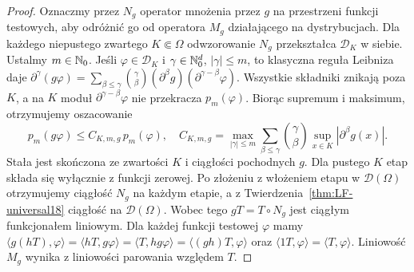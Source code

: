 \begin{proof}
Oznaczmy przez $N_g$ operator mnożenia przez $g$ na
przestrzeni funkcji testowych, aby odróżnić go od operatora
$M_g$ działającego na dystrybucjach.
Dla każdego niepustego zwartego $K\Subset\Omega$
odwzorowanie $N_g$ przekształca $\mathcal D_K$ w siebie.
Ustalmy $m\in\mathbb N_0$. Jeśli $\varphi\in\mathcal D_K$
i $\gamma\in\mathbb N_0^d$, $|\gamma|\le m$, to
klasyczna reguła Leibniza daje
$\partial^\gamma(g\varphi)=\sum_{\beta\le\gamma}
\binom\gamma\beta(\partial^\beta g)
(\partial^{\gamma-\beta}\varphi)$.
Wszystkie składniki znikają poza $K$, a na $K$ moduł
$\partial^{\gamma-\beta}\varphi$ nie przekracza $p_m(\varphi)$.
Biorąc supremum i maksimum, otrzymujemy oszacowanie
\[
 p_m(g\varphi)\le C_{K,m,g}\,p_m(\varphi),
 \quad C_{K,m,g}=\max_{|\gamma|\le m}
 \sum_{\beta\le\gamma}\binom\gamma\beta
 \sup_{x\in K}|\partial^\beta g(x)|.
\]
Stała jest skończona ze zwartości $K$ i ciągłości pochodnych $g$.
Dla pustego $K$ etap składa się wyłącznie z funkcji zerowej.
Po złożeniu z włożeniem etapu w $\mathcal D(\Omega)$
otrzymujemy ciągłość $N_g$ na każdym etapie, a z
Twierdzenia~\ref{thm:LF-universal18} ciągłość na $\mathcal D(\Omega)$.
Wobec tego $gT=T\circ N_g$ jest ciągłym funkcjonałem liniowym.
Dla każdej funkcji testowej $\varphi$ mamy
$\langle g(hT),\varphi\rangle=\langle hT,g\varphi\rangle
=\langle T,hg\varphi\rangle=\langle(gh)T,\varphi\rangle$
oraz $\langle1T,\varphi\rangle=\langle T,\varphi\rangle$.
Liniowość $M_g$ wynika z liniowości parowania względem $T$.


\end{proof}

